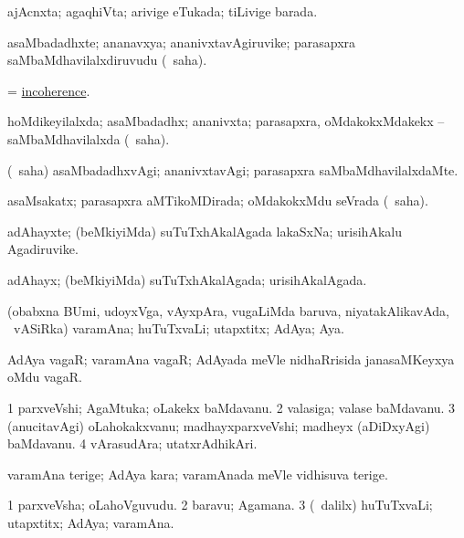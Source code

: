 \bentry
{}
\gl{\gu}
\bmng
ajAcnxta; agaqhiVta; arivige eTukada; tiLivige barada. 
\emng
\eentry

\bentry
{}
\gl{\nA}
\bmng
asaMbadadhxte; ananavxya; ananivxtavAgiruvike; parasapxra saMbaMdhavilalxdiruvudu (\rUpa\ saha). 
\emng
\eentry

\bentry
{}
\gl{\nA}
\bmng
 = \hyperlink{incoherence}{incoherence}. 
\emng
\eentry

\bentry
{}
\gl{\gu}
\bmng
hoMdikeyilalxda; asaMbadadhx; ananivxta; parasapxra, oMdakokxMdakekx -- saMbaMdhavilalxda (\rUpa\ saha). 
\emng
\eentry

\bentry
{}
\gl{\kirxvi}
\bmng
(\rUpa\ saha) asaMbadadhxvAgi; ananivxtavAgi; parasapxra saMbaMdhavilalxdaMte. 
\emng
\eentry

\bentry
{}
\gl{\gu}
\bmng
asaMsakatx; parasapxra aMTikoMDirada; oMdakokxMdu seVrada (\rUpa\ saha). 
\emng
\eentry

\bentry
{}
\gl{\nA}
\bmng
adAhayxte; (beMkiyiMda) suTuTxhAkalAgada lakaSxNa; urisihAkalu Agadiruvike. 
\emng
\eentry

\bentry
{}
\gl{\gu}
\bmng
adAhayx; (beMkiyiMda) suTuTxhAkalAgada; urisihAkalAgada. 
\emng
\eentry

\bentry
{}
\gl{\nA}
\bmng
(obabxna BUmi, udoyxVga, vAyxpAra, \mo vugaLiMda baruva, niyatakAlikavAda, \sA\ vASiRka) varamAna; huTuTxvaLi; utapxtitx; AdAya; Aya. 
\emng
\eentry

\bentry
{}
\gl{\nA}
\bmng
AdAya vagaR; varamAna vagaR; AdAyada meVle nidhaRrisida janasaMKeyxya oMdu vagaR. 
\emng
\eentry

\bentry
{}
\gl{\nA}
\bmng
\bnum
\num{1} parxveVshi; AgaMtuka; oLakekx baMdavanu. 
\num{2} valasiga; valase baMdavanu. 
\num{3} (anucitavAgi) oLahokakxvanu; madhayxparxveVshi; madheyx (aDiDxyAgi) baMdavanu. 
\num{4} vArasudAra; utatxrAdhikAri. 
\enum
\emng
\eentry

\bentry
{}
\gl{\nA}
\bmng
varamAna terige; AdAya kara; varamAnada meVle vidhisuva terige. 
\emng
\eentry

\bentry
{}
\gl{\nA}
\bmng
\bnum
\num{1} parxveVsha; oLahoVguvudu. 
\num{2} baravu; Agamana. 
\num{3} (\sA\ \bava dalilx) huTuTxvaLi; utapxtitx; AdAya; varamAna. 
\enum
\emng
\eentry

